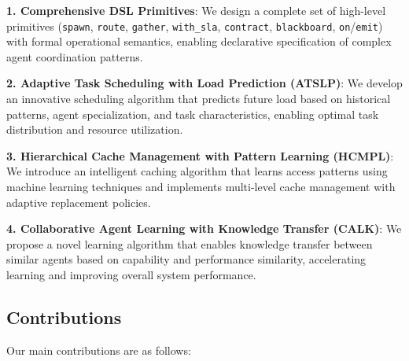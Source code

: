 \documentclass[conference]{IEEEtran}
\begin{document}
\textbf{1. Comprehensive DSL Primitives}: We design a complete set of high-level primitives (\texttt{spawn}, \texttt{route}, \texttt{gather}, \texttt{with\_sla}, \texttt{contract}, \texttt{blackboard}, \texttt{on}/\texttt{emit}) with formal operational semantics, enabling declarative specification of complex agent coordination patterns.

\textbf{2. Adaptive Task Scheduling with Load Prediction (ATSLP)}: We develop an innovative scheduling algorithm that predicts future load based on historical patterns, agent specialization, and task characteristics, enabling optimal task distribution and resource utilization.

\textbf{3. Hierarchical Cache Management with Pattern Learning (HCMPL)}: We introduce an intelligent caching algorithm that learns access patterns using machine learning techniques and implements multi-level cache management with adaptive replacement policies.

\textbf{4. Collaborative Agent Learning with Knowledge Transfer (CALK)}: We propose a novel learning algorithm that enables knowledge transfer between similar agents based on capability and performance similarity, accelerating learning and improving overall system performance.

\subsection{Contributions}

Our main contributions are as follows:
\end{document}
